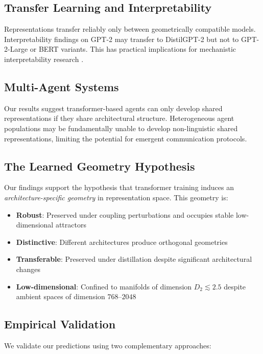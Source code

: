 \documentclass[10pt]{article} %
\theoremstyle{plain}
\theoremstyle{definition}
\theoremstyle{remark}
\begin{document}
\subsection{Transfer Learning and Interpretability}

Representations transfer reliably only between geometrically compatible models. Interpretability findings on GPT-2 may transfer to DistilGPT-2 but not to GPT-2-Large or BERT variants. This has practical implications for mechanistic interpretability research \cite{elhage2021mathematical}.

\subsection{Multi-Agent Systems}

Our results suggest transformer-based agents can only develop shared representations if they share architectural structure. Heterogeneous agent populations may be fundamentally unable to develop non-linguistic shared representations, limiting the potential for emergent communication protocols.

\subsection{The Learned Geometry Hypothesis}

Our findings support the hypothesis that transformer training induces an \textit{architecture-specific geometry} in representation space. This geometry is:
\begin{itemize}
    \item \textbf{Robust}: Preserved under coupling perturbations and occupies stable low-dimensional attractors
    \item \textbf{Distinctive}: Different architectures produce orthogonal geometries
    \item \textbf{Transferable}: Preserved under distillation despite significant architectural changes
    \item \textbf{Low-dimensional}: Confined to manifolds of dimension $D_2 \lesssim 2.5$ despite ambient spaces of dimension $768$--$2048$
\end{itemize}


\subsection{Empirical Validation}

We validate our predictions using two complementary approaches:
\end{document}

